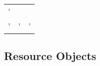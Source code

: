 \documentclass[]{article}
\theoremstyle{plain}
\theoremstyle{remark}
\theoremstyle{definition}
\begin{document}
\begin{longtable}[]{@{}lll@{}}
\begin{minipage}[t]{0.11\columnwidth}
'\strut
\end{minipage}\tabularnewline
\begin{minipage}[t]{0.41\columnwidth}\raggedright
'\strut
\end{minipage} & \begin{minipage}[t]{0.28\columnwidth}\raggedright
'\strut
\end{minipage} & \begin{minipage}[t]{0.11\columnwidth}\raggedright
'\strut
\end{minipage}\tabularnewline
\bottomrule
\end{longtable}

\hypertarget{resource-objects}{%
\subsection{Resource Objects}\label{resource-objects}}
\end{document}
